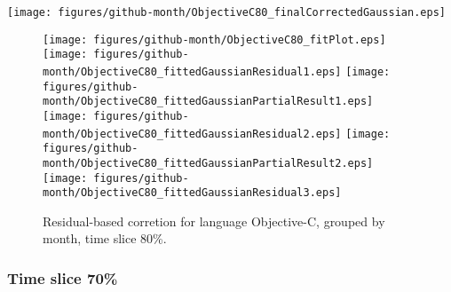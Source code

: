 \begin{center}
{\texttt{[image: figures/github-month/ObjectiveC80\_finalCorrectedGaussian.eps]}}
\end{center}

\FloatBarrier

\begin{figure}[t]
\centering
{}
{\texttt{[image: figures/github-month/ObjectiveC80\_fitPlot.eps]}}
{\texttt{[image: figures/github-month/ObjectiveC80\_fittedGaussianResidual1.eps]}}
{\texttt{[image: figures/github-month/ObjectiveC80\_fittedGaussianPartialResult1.eps]}}
{\texttt{[image: figures/github-month/ObjectiveC80\_fittedGaussianResidual2.eps]}}
{\texttt{[image: figures/github-month/ObjectiveC80\_fittedGaussianPartialResult2.eps]}}
{\texttt{[image: figures/github-month/ObjectiveC80\_fittedGaussianResidual3.eps]}}
\caption{Residual-based corretion for language Objective-C, grouped by month, time slice 80\%.}
\end{figure}


\FloatBarrier


\subsubsection{Time slice 70\%}

